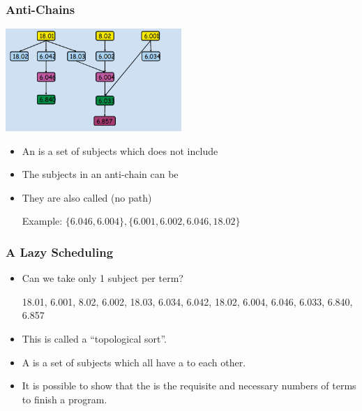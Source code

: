 \documentclass{beamer}
\begin{document}
\begin{frame}
  \frametitle{Anti-Chains}
  \includegraphics[width=0.5\textwidth]{../img/greedy_schedule}

  {\larger
    \begin{itemize}
    \item An  is a set of subjects which does
      not include 
    \item The subjects in an anti-chain can be 
    \item They are also called  (no path)
      \medskip
      \begin{center}
        Example: $\{6.046, 6.004\},\{6.001, 6.002, 6.046, 18.02\}$
      \end{center}
    \end{itemize}
  }
\end{frame}

\begin{frame}
  \frametitle{A Lazy Scheduling}

  {\larger
  \begin{itemize}
  \item Can we take only 1 subject per term?\\

    \begin{center}
      18.01, 6.001, 8.02, 6.002, 18.03, 6.034, 6.042, 18.02, 6.004,
      6.046, 6.033, 6.840, 6.857
    \end{center}

    \bigskip

  \item This is called a ``topological sort''.

    \bigskip

  \item A  is a set of subjects which all have a
     to each other.

    \bigskip

  \item It is possible to show that the  is
    the requisite and necessary numbers of terms to finish a program.

  \end{itemize}
  }
\end{frame}
\end{document}
